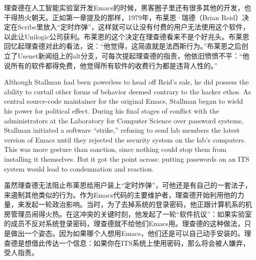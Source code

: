 \ifdefined\chs
理查德在人工智能实验室开发Emacs的时候，黑客圈子里还有很多其他的开发，也干得热火朝天。正如第一章提及的那样，1979年，布莱恩·瑞德（Brian Reid）决定在Scribe里放入“定时炸弹”，这样就可以让没有付费的用户无法使用这个软件，以此让Unilogic公司获利。布莱恩的这个决定在理查德看来不是个好兆头。布莱恩回忆起理查德对此的看法，说：“他觉得，这简直就是法西斯行为。”布莱恩之后创立了Usenet新闻组上的alt分支，可每次提起理查德的指责，他依旧愤愤不平：“他说所有的软件都得免费，他觉得所有软件的收费行为都是违背人性的。”
\fi

\ifdefined\eng
Although Stallman had been powerless to head off Reid's sale, he did possess the ability to curtail other forms of behavior deemed contrary to the hacker ethos. As central source-code maintainer for the original Emacs, Stallman began to wield his power for political effect. During his final stages of conflict with the administrators at the Laboratory for Computer Science over password systems, Stallman initiated a software ``strike,'' refusing to send lab members the latest version of Emacs until they rejected the security system on the lab's computers. This was more gesture than sanction, since nothing could stop them from installing it themselves. But it got the point across: putting passwords on an ITS system would lead to condemnation and reaction.
\fi

\ifdefined\chs
虽然理查德无法阻止布莱恩给用户装上“定时炸弹”，可他还是有自己的一套法子，来遏制其他类似的行为。作为Emacs代码的主要维护者，理查德开始利用他的力量，来发起一轮政治影响。当时，为了去掉系统的登录密码，他正跟计算机系的机房管理员闹得火热。在这冲突的关键时刻，他发起了一轮“软件抗议”：如果实验室的成员不反对系统登录密码，理查德就不给他们Emacs用。理查德的这种做法，只是做出一个姿态。因为如果哪个人想用Emacs，他们还是可以自己动手安装的。理查德是想借此传达一个信息：如果你在ITS系统上使用密码，那么将会被人嫌弃，受人指责。
\fi

